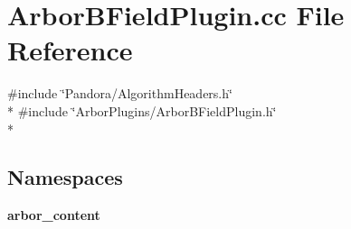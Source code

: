 \section{Arbor\+B\+Field\+Plugin.\+cc File Reference}
\label{ArborBFieldPlugin_8cc}
{\ttfamily \#include \char`\"{}Pandora/\+Algorithm\+Headers.\+h\char`\"{}}\\*
{\ttfamily \#include \char`\"{}Arbor\+Plugins/\+Arbor\+B\+Field\+Plugin.\+h\char`\"{}}\\*
\subsection*{Namespaces}
\begin{DoxyCompactItemize}
\item 
 {\bf arbor\+\_\+content}
\end{DoxyCompactItemize}
